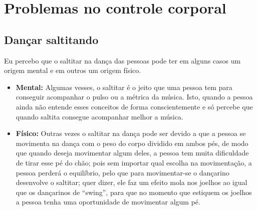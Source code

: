 \section{Problemas no controle corporal}

\subsection{Dançar saltitando}

\begin{problemT}
Eu percebo que o saltitar na dança das pessoas pode ter em alguns casos um origem mental e em outros um origem físico.
\begin{itemize}
\item \textbf{Mental:} Algumas vesses, o saltitar
é o jeito que  uma pessoa tem para conseguir acompanhar o pulso ou a métrica da música. 
Isto, quando a pessoa ainda não entende esses conceitos de forma conscientemente
e só percebe que quando saltita consegue acompanhar melhor a música.
\item \textbf{Físico:} Outras vezes o saltitar na dança pode ser devido a que a pessoa se movimenta na dança
com o peso do corpo dividido em ambos pés, de modo que quando deseja movimentar algum deles,
a pessoa tem muita dificuldade de tirar esse pé do chão; 
pois sem importar qual escolha na movimentação, a pessoa perderá o equilíbrio,
pelo que para movimentar-se o dançarino desenvolve o saltitar; quer dizer, 
ele faz um efeito mola nos joelhos ao igual que os dançarinos de ``swing'', 
para que no momento que estiquem os joelhos a pessoa tenha uma oportunidade de movimentar algum pé.    
\end{itemize}
\end{problemT}


